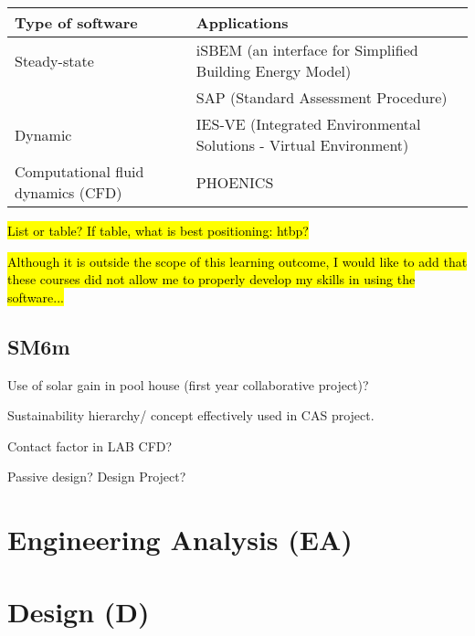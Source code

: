 \begin{table}[htbp]
\begin{tabular}{@{}lp{8cm}@{}}
\toprule
Type of software & Applications \\ \midrule
Steady-state & iSBEM (an interface for Simplified Building Energy Model) \\
 & SAP (Standard Assessment Procedure) \\
Dynamic & IES-VE (Integrated Environmental Solutions - Virtual Environment) \\
Computational fluid dynamics (CFD) & PHOENICS \\ \bottomrule
\end{tabular}
\end{table}

\hl{List or table? If table, what is best positioning: htbp?}

\hl{Although it is outside the scope of this learning outcome, I would like to add that these courses did not allow me to properly develop my skills in using the software...}


\subsection*{SM6m}

Use of solar gain in pool house (first year collaborative project)?

Sustainability hierarchy/ concept effectively used in CAS project.

Contact factor in LAB CFD?

Passive design? Design Project?



\section{Engineering Analysis (EA)}



\section{Design (D)}


